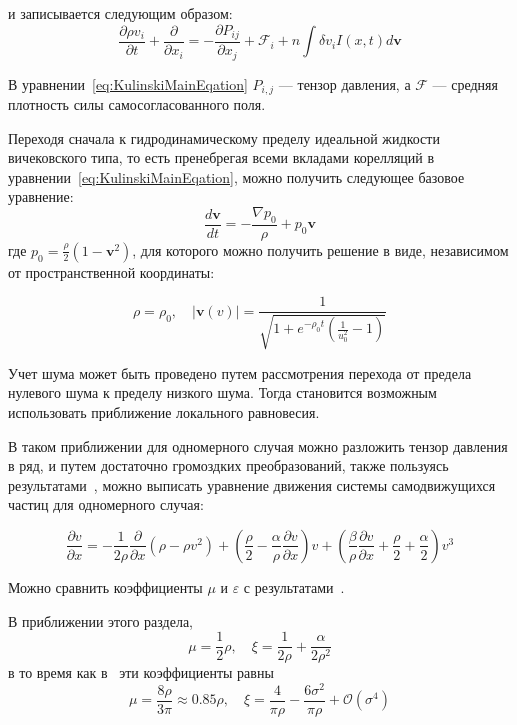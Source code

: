 	и записывается следующим образом:
	\begin{equation}
	\label{eq:KulinskiMainEqation}
		\frac{\partial \rho v_i}{\partial t} + \frac{\partial}{\partial x_i} = -\frac{\partial P_{ij}}{\partial x_j} + \mathcal{F}_i + n \int \delta v_i I(x,t)d\boldsymbol{v}
	\end{equation}

	В уравнении~\ref{eq:KulinskiMainEqation} $P_{i,j}$ --- тензор давления, а $\mathcal{F}$ --- средняя плотность силы самосогласованного поля.

	Переходя сначала к гидродинамическому пределу идеальной жидкости вичековского типа, то есть пренебрегая всеми вкладами корелляций в уравнении~\ref{eq:KulinskiMainEqation}, можно получить следующее базовое уравнение:
	\begin{equation}
		\frac{d \boldsymbol{v}}{dt} = -\frac{\nabla p_0}{\rho} + p_0 \boldsymbol{v}
	\end{equation}
	где $p_0 = \frac{\rho}{2} (1-\boldsymbol{v}^2)$, для которого можно получить решение в виде, независимом от пространственной координаты:

	\begin{equation}
	 	\rho = \rho_0, \quad |\boldsymbol{v}(v)| = \frac{1}{\sqrt{1+e^{-\rho_0 t}(\frac{1}{u_0^2}-1)}}
	\end{equation} 

	Учет шума может быть проведено путем рассмотрения перехода от предела нулевого шума к пределу низкого шума. Тогда становится возможным использовать приближение локального равновесия.

	В таком приближении для одномерного случая можно разложить тензор давления в ряд, и путем достаточно громоздких преобразований, также пользуясь результатами~\cite{kulinskii2009}, можно выписать уравнение движения системы самодвижущихся частиц для одномерного случая:

	\begin{equation}
	\label{eq:KulinsciiEqOfMotion}
		\frac{\partial v}{\partial x} = -\frac{1}{2 \rho} \frac{\partial}{\partial x} (\rho -\rho v^2)+(\frac{\rho}{2} - \frac{\alpha}{\rho} \frac{\partial v}{\partial x})v + (\frac{\beta}{\rho} \frac{\partial v}{\partial x} + \frac{\rho}{2} + \frac{\alpha}{2}) v^3
	\end{equation}

	Можно сравнить коэффициенты $\mu$ и $\varepsilon$ с результатами~\cite{bertin2006}.

	В приближении этого раздела, 
	\begin{equation}
	\label{eq:KulinsciiCoefficients}
		\mu = \frac{1}{2}\rho, \quad \xi = \frac{1}{2\rho} + \frac{\alpha}{2\rho^2}
	\end{equation}
	в то время как в~\cite{bertin2006} эти коэффициенты равны
	\begin{equation}
		\mu = \frac{8 \rho}{3\pi} \approx 0.85 \rho, \quad \xi = \frac{4}{\pi\rho} - \frac{6 \sigma^2}{\pi \rho} + \mathcal{O}(\sigma^4)
	\end{equation}

